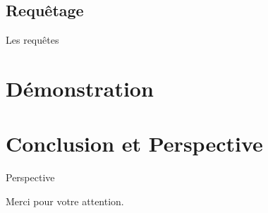 \documentclass[10pt,handout]{beamer}
\begin{document}
\subsection{Requêtage}
\begin{frame}{Les requêtes}
    
\end{frame}


\section{Démonstration}


\section{Conclusion et Perspective}

\begin{frame}{Perspective}

\end{frame}

\begin{frame}
  \begin{center}
    Merci pour votre attention.
  \end{center}
\end{frame}
\end{document}
